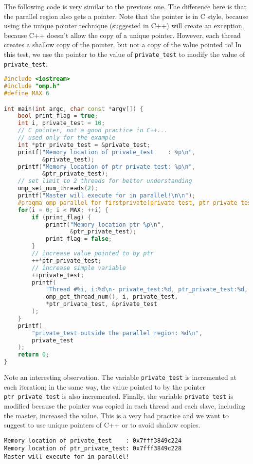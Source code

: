 \begin{examplebox}
    The following code is very similar to the previous one. The difference here is that the parallel region also gets a pointer. Note that the pointer is in C style, because using the unique pointer technique (suggested in C++) will create an exception, because C++ doesn't allow the copy of a unique pointer. However, each thread creates a shallow copy of the pointer, but not a copy of the value pointed to! In this test, we use the pointer to the value of \texttt{private\_test} to modify the value of \texttt{private\_test}.
    \begin{lstlisting}[language=C++]
#include <iostream>
#include "omp.h"
#define MAX 6

int main(int argc, char const *argv[]) {
    bool print_flag = true;
    int i, private_test = 10;
    // C pointer, not a good practice in C++...
    // used only for the example
    int *ptr_private_test = &private_test;
    printf("Memory location of private_test    : %p\n", 
           &private_test);
    printf("Memory location of ptr_private_test: %p\n",
           &ptr_private_test);
    // set limit to 2 threads for better understanding
    omp_set_num_threads(2);
    printf("Master will execute for in parallel!\n\n");
    #pragma omp parallel for firstprivate(private_test, ptr_private_test, print_flag)
    for(i = 0; i < MAX; ++i) {
        if (print_flag) {
            printf("Memory location ptr %p\n", 
                   &ptr_private_test);
            print_flag = false;
        }
        // increase value pointed to by ptr
        ++*ptr_private_test;
        // increase simple variable
        ++private_test;
        printf(
            "Thread #%i, i:%d\n- private_test:%d, ptr_private_test:%d, mem: %p\n\n", 
            omp_get_thread_num(), i, private_test,
            *ptr_private_test, &private_test
        );
    }
    printf(
        "private_test outside the parallel region: %d\n", 
        private_test
    );
    return 0;
}\end{lstlisting}
    Note an interesting observation. The variable \texttt{private\_test} is incremented at each iteration; in the same way, the value pointed to by the pointer \texttt{ptr\_private\_test} is also incremented. Finally, the variable \texttt{private\_test} is modified because the pointer was copied in each thread and each slave, including the master, increased the value. This is a very bad practice and we want to suggest to use unique pointers of C++ or to avoid shallow copies.
    \begin{lstlisting}[mathescape=false]
Memory location of private_test    : 0x7fff3849c224
Memory location of ptr_private_test: 0x7fff3849c228
Master will execute for in parallel!


\end{lstlisting}
\end{examplebox}
